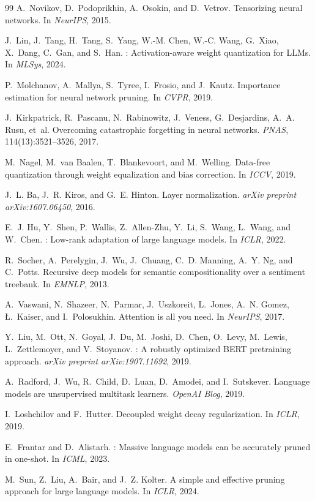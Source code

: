 \begin{thebibliography}{99}
A.~Novikov, D.~Podoprikhin, A.~Osokin, and D.~Vetrov.
\newblock Tensorizing neural networks.
\newblock In \emph{NeurIPS}, 2015.

J.~Lin, J.~Tang, H.~Tang, S.~Yang, W.-M. Chen, W.-C. Wang, G.~Xiao, X.~Dang, C.~Gan, and S.~Han.
: Activation-aware weight quantization for {LLM}s.
\newblock In \emph{MLSys}, 2024.

P.~Molchanov, A.~Mallya, S.~Tyree, I.~Frosio, and J.~Kautz.
\newblock Importance estimation for neural network pruning.
\newblock In \emph{CVPR}, 2019.

J.~Kirkpatrick, R.~Pascanu, N.~Rabinowitz, J.~Veness, G.~Desjardins, A.~A. Rusu, et~al.
\newblock Overcoming catastrophic forgetting in neural networks.
\newblock \emph{PNAS}, 114(13):3521--3526, 2017.

M.~Nagel, M.~van Baalen, T.~Blankevoort, and M.~Welling.
\newblock Data-free quantization through weight equalization and bias correction.
\newblock In \emph{ICCV}, 2019.

J.~L. Ba, J.~R. Kiros, and G.~E. Hinton.
\newblock Layer normalization.
\newblock \emph{arXiv preprint arXiv:1607.06450}, 2016.

E.~J. Hu, Y.~Shen, P.~Wallis, Z.~Allen-Zhu, Y.~Li, S.~Wang, L.~Wang, and W.~Chen.
: Low-rank adaptation of large language models.
\newblock In \emph{ICLR}, 2022.

R.~Socher, A.~Perelygin, J.~Wu, J.~Chuang, C.~D. Manning, A.~Y. Ng, and C.~Potts.
\newblock Recursive deep models for semantic compositionality over a sentiment treebank.
\newblock In \emph{EMNLP}, 2013.

A.~Vaswani, N.~Shazeer, N.~Parmar, J.~Uszkoreit, L.~Jones, A.~N. Gomez, {\L}.~Kaiser, and I.~Polosukhin.
\newblock Attention is all you need.
\newblock In \emph{NeurIPS}, 2017.

Y.~Liu, M.~Ott, N.~Goyal, J.~Du, M.~Joshi, D.~Chen, O.~Levy, M.~Lewis, L.~Zettlemoyer, and V.~Stoyanov.
: A robustly optimized {BERT} pretraining approach.
\newblock \emph{arXiv preprint arXiv:1907.11692}, 2019.

A.~Radford, J.~Wu, R.~Child, D.~Luan, D.~Amodei, and I.~Sutskever.
\newblock Language models are unsupervised multitask learners.
\newblock \emph{OpenAI Blog}, 2019.

I.~Loshchilov and F.~Hutter.
\newblock Decoupled weight decay regularization.
\newblock In \emph{ICLR}, 2019.

E.~Frantar and D.~Alistarh.
: Massive language models can be accurately pruned in one-shot.
\newblock In \emph{ICML}, 2023.

M.~Sun, Z.~Liu, A.~Bair, and J.~Z. Kolter.
\newblock A simple and effective pruning approach for large language models.
\newblock In \emph{ICLR}, 2024.

\end{thebibliography}
